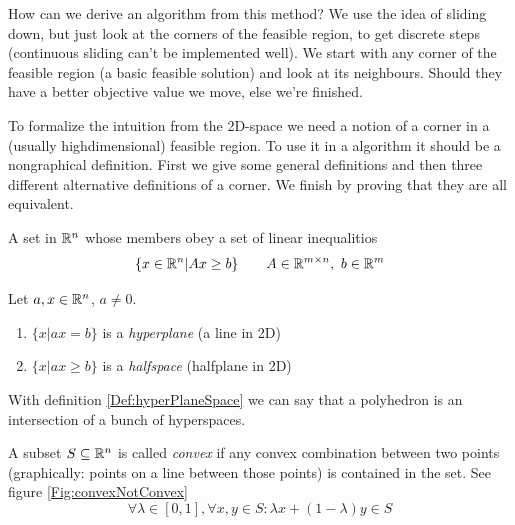 How can we derive an algorithm from this method? We use the idea of sliding down, but just look at the corners of the feasible region, to get discrete steps (continuous sliding can't be implemented well). We start with any corner of the feasible region (a basic feasible solution) and look at its neighbours. Should they have a better objective value we move, else we're finished. 

To formalize the intuition from the 2D-space we need a notion of a corner in a (usually highdimensional) feasible region. To use it in a algorithm it should be a nongraphical definition. First we give some general definitions and then three different alternative definitions of a corner. We finish by proving that they are all equivalent.

\begin{Def}[Polyhedron] A set in $\mathbb{R}^n$ whose members obey a set of linear inequalitios
\[\{x\in \mathbb{R}^n | Ax \geq b\} \qquad A\in \mathbb{R}^{m\times n},\ b\in \mathbb{R}^m\]
\end{Def}

\begin{Def} \label{Def:hyperPlaneSpace} Let $a,x\in \mathbb{R}^n$, $a\neq 0$. 
\begin{enumerate}
\item $\{x|ax=b\}$ is a \emph{hyperplane} (a line in 2D)
\item $\{x|ax\geq b\}$ is a \emph{halfspace} (halfplane in 2D)
\end{enumerate}
\end{Def}

With definition \ref{Def:hyperPlaneSpace} we can say that a polyhedron is an intersection of a bunch of hyperspaces.

\begin{Def} A subset $S \subseteq \mathbb{R}^n$ is called \emph{convex} if any convex combination between two points (graphically: points on a line between those points) is contained in the set. See figure \ref{Fig:convexNotConvex}
\[\forall \lambda \in [0,1], \forall x,y\in S: \lambda x + (1-\lambda) y \in S\]
\end{Def}

